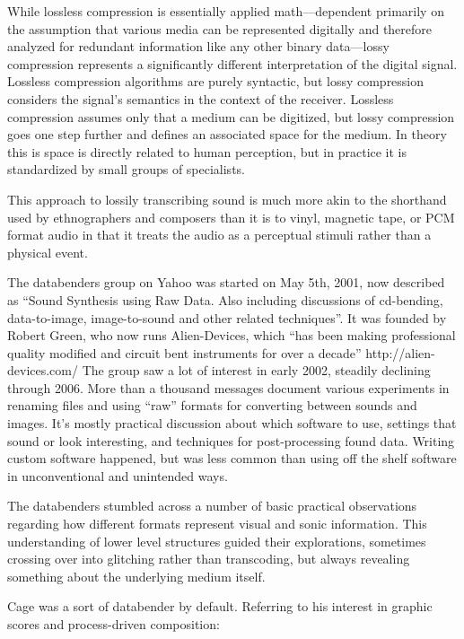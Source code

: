\documentclass{thesis}
\begin{document}
	While lossless compression is essentially applied math---dependent primarily on the assumption that various media can be represented digitally and therefore analyzed for redundant information like any other binary data---lossy compression represents a significantly different interpretation of the digital signal. Lossless compression algorithms are purely syntactic, but lossy compression considers the signal's semantics in the context of the receiver. Lossless compression assumes only that a medium can be digitized, but lossy compression goes one step further and defines an associated space for the medium. In theory this is space is directly related to human perception, but in practice it is standardized by small groups of specialists.
	
	This approach to lossily transcribing sound is much more akin to the shorthand used by ethnographers and composers than it is to vinyl, magnetic tape, or PCM format audio in that it treats the audio as a perceptual stimuli rather than a physical event.
	
	The databenders group on Yahoo\cite{indianropeburn_databenders_????} was started on May 5th, 2001, now described as ``Sound Synthesis using Raw Data. Also including discussions of cd-bending, data-to-image, image-to-sound and other related techniques''. It was founded by Robert Green, who now runs Alien-Devices, which ``has been making professional quality modified and circuit bent instruments for over a decade'' http://alien-devices.com/ The group saw a lot of interest in early 2002, steadily declining through 2006. More than a thousand messages document various experiments in renaming files and using ``raw'' formats for converting between sounds and images. It's mostly practical discussion about which software to use, settings that sound or look interesting, and techniques for post-processing found data. Writing custom software happened, but was less common than using off the shelf software in unconventional and unintended ways.
	
	The databenders stumbled across a number of basic practical observations regarding how different formats represent visual and sonic information. This understanding of lower level structures guided their explorations, sometimes crossing over into glitching rather than transcoding, but always revealing something about the underlying medium itself.
	
	Cage was a sort of databender by default. Referring to his interest in graphic scores and process-driven composition:
\end{document}
